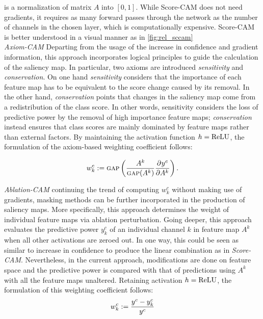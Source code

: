 is a normalization of matrix $A$ into $[0,1]$. While Score-CAM does not need gradients, it requires 
as many forward passes through the network as the number of channels in the chosen layer, which is 
computationally expensive. Score-CAM is better understood in a visual manner as in 
\autoref{fig:rel_sccam}\\


\noindent \emph{Axiom-CAM} \autocite{axiombased} Departing from the usage of the increase in 
confidence and gradient information, this approach incorporates logical principles to guide the 
calculation of the saliency map. In particular, two axioms are introduced \emph{sensitivity} and 
\emph{conservation}. On one hand \emph{sensitivity} considers that the importance of each feature 
map has to be equivalent to the score change caused by its removal. In the other hand, \emph{conservation} 
points that changes in the saliency map come from a redistribution of the class score. In other 
words, sensitivity considers the loss of predictive power by the removal of high importance 
feature maps; \emph{conservation} instead ensures that class scores are mainly dominated by feature 
maps rather than external factors. By maintaining the activation function $h = {\operatorname{ReLU}}$, the 
formulation of the axiom-based weighting coefficient follows:

\begin{equation}
	w^c_k \mathrel{:=} {\textsc{gap}} \left( \frac{A^k}{{\textsc{gap}}(A^k)}\frac{\partial^{}{y^c}}{\partial{{A^k}^{}}}\right).
	\label{eq:ax_cam}
\end{equation}

\noindent \emph{Ablation-CAM} \autocite{ablationcam} continuing the trend of computing $w^c_k$ 
without making use of gradients, masking methods can be further incorporated in the production of 
saliency maps. More specifically, this approach determines the weight of individual feature maps 
via ablation perturbation. Going deeper, this approach evaluates the predictive power $y^c_k$ of an 
individual channel $k$ in feature map $A^k$ when all other activations are zeroed out. In one way, 
this could be seen as similar to increase in confidence to produce the linear combination as in 
\emph{Score-CAM}. Nevertheless, in the current approach, modifications are done on feature space 
and the predictive power is compared with that of predictions using $A^k$ with all the feature maps 
unaltered. Retaining activation $h = {\operatorname{ReLU}}$, the formulation of this weighting coefficient follows:
\begin{equation}
	w^c_k \mathrel{:=} \frac{y^c-y^c_k}{y^c}
\end{equation}

